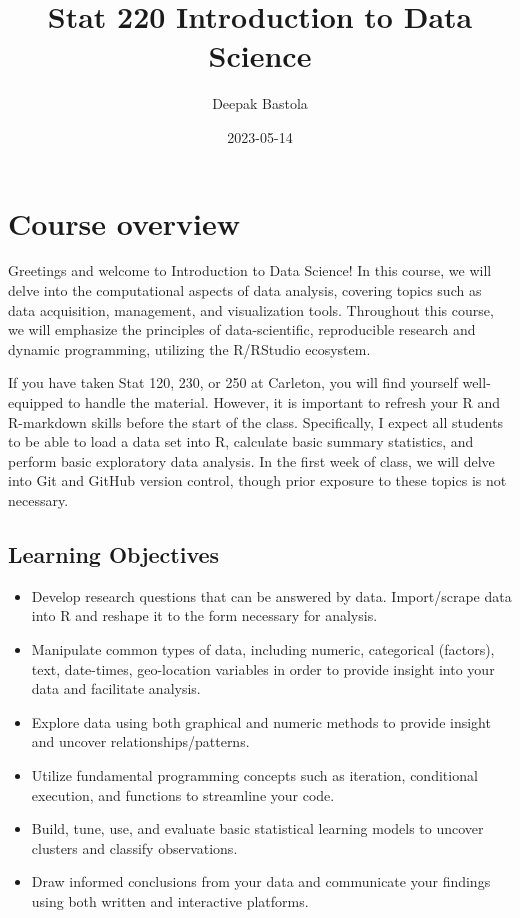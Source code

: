 \documentclass[
]{book}
\title{Stat 220 Introduction to Data Science}
\author{Deepak Bastola}
\date{2023-05-14}
\providecommand{\tightlist}{%
  \setlength{\itemsep}{0pt}\setlength{\parskip}{0pt}}
\begin{document}
\maketitle

{
\setcounter{tocdepth}{1}
\tableofcontents
}
\hypertarget{course-overview}{%
\chapter*{Course overview}\label{course-overview}}

Greetings and welcome to Introduction to Data Science! In this course, we will delve into the computational aspects of data analysis, covering topics such as data acquisition, management, and visualization tools. Throughout this course, we will emphasize the principles of data-scientific, reproducible research and dynamic programming, utilizing the R/RStudio ecosystem.

If you have taken Stat 120, 230, or 250 at Carleton, you will find yourself well-equipped to handle the material. However, it is important to refresh your R and R-markdown skills before the start of the class. Specifically, I expect all students to be able to load a data set into R, calculate basic summary statistics, and perform basic exploratory data analysis. In the first week of class, we will delve into Git and GitHub version control, though prior exposure to these topics is not necessary.

\hypertarget{learning-objectives}{%
\section{Learning Objectives}\label{learning-objectives}}

\begin{itemize}
\tightlist
\item
  Develop research questions that can be answered by data. Import/scrape data into R and reshape it to the form necessary for analysis.
\item
  Manipulate common types of data, including numeric, categorical (factors), text, date-times, geo-location variables in order to provide insight into your data and facilitate analysis.
\item
  Explore data using both graphical and numeric methods to provide insight and uncover relationships/patterns.
\item
  Utilize fundamental programming concepts such as iteration, conditional execution, and functions to streamline your code.
\item
  Build, tune, use, and evaluate basic statistical learning models to uncover clusters and classify observations.
\item
  Draw informed conclusions from your data and communicate your findings using both written and interactive platforms.
\end{itemize}
\end{document}
